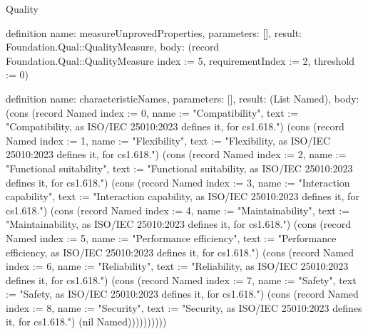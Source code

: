 \begin{lexlean}{Quality}
\begin{semanticmodule}
definition{
  name: measureUnprovedProperties,
  parameters: [],
  result: Foundation.Qual::QualityMeasure,
  body: (record Foundation.Qual::QualityMeasure {index := 5, requirementIndex := 2, threshold := 0})
}

definition{
  name: characteristicNames,
  parameters: [],
  result: (List Named),
  body: (cons (record Named {index := 0, name := "Compatibility", text := "Compatibility, as ISO/IEC 25010:2023 defines it, for cs1.618."}) (cons (record Named {index := 1, name := "Flexibility", text := "Flexibility, as ISO/IEC 25010:2023 defines it, for cs1.618."}) (cons (record Named {index := 2, name := "Functional suitability", text := "Functional suitability, as ISO/IEC 25010:2023 defines it, for cs1.618."}) (cons (record Named {index := 3, name := "Interaction capability", text := "Interaction capability, as ISO/IEC 25010:2023 defines it, for cs1.618."}) (cons (record Named {index := 4, name := "Maintainability", text := "Maintainability, as ISO/IEC 25010:2023 defines it, for cs1.618."}) (cons (record Named {index := 5, name := "Performance efficiency", text := "Performance efficiency, as ISO/IEC 25010:2023 defines it, for cs1.618."}) (cons (record Named {index := 6, name := "Reliability", text := "Reliability, as ISO/IEC 25010:2023 defines it, for cs1.618."}) (cons (record Named {index := 7, name := "Safety", text := "Safety, as ISO/IEC 25010:2023 defines it, for cs1.618."}) (cons (record Named {index := 8, name := "Security", text := "Security, as ISO/IEC 25010:2023 defines it, for cs1.618."}) (nil Named))))))))))
}


\end{semanticmodule}
\end{lexlean}
